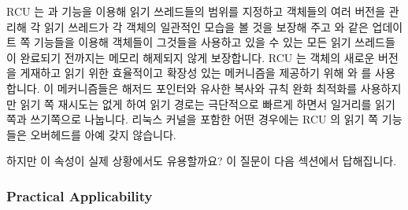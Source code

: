 RCU 는  과  기능을 이용해 읽기
쓰레드들의 범위를 지정하고 객체들의 여러 버전을 관리해 각 읽기 쓰레드가 각
객체의 일관적인 모습을 볼 것을 보장해 주고  와 같은
업데이트 쪽 기능들을 이용해  객체들이 그것들을 사용하고 있을 수 있는 모든 읽기
쓰레드들이 완료되기 전까지는 메모리 해제되지 않게 보장합니다.
RCU 는 객체의 새로운 버전을 게재하고 읽기 위한 효율적이고 확장성 있는
메커니즘을 제공하기 위해  와  를
사용합니다.
이 메커니즘들은 해저드 포인터와 유사한 복사와 규칙 완화 최적화를 사용하지만
읽기 쪽 재시도는 없게 하여 읽기 경로는 극단적으로 빠르게 하면서 일거리를 읽기
쪽과 쓰기쪽으로 나눕니다.
 리눅스 커널을 포함한 어떤 경우에는 RCU 의 읽기 쪽
기능들은 오버헤드를 아예 갖지 않습니다.

하지만 이 속성이 실제 상황에서도 유용할까요?
이 질문이 다음 섹션에서 답해집니다.

\subsubsection{Practical Applicability}
\label{sec:defer:Practical Applicability}

